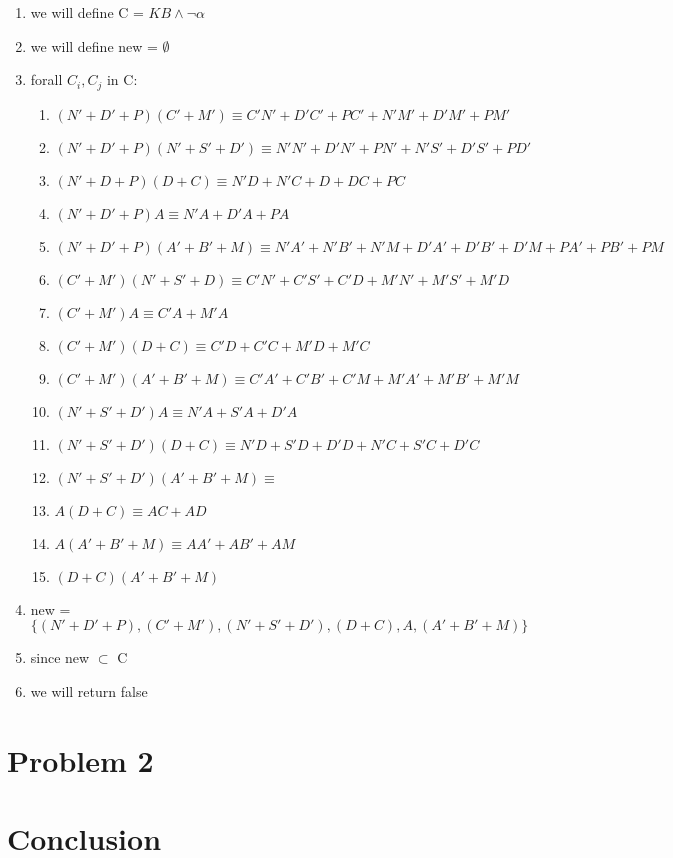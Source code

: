 \documentclass{article}
\begin{document}
\begin{enumerate}
    \item we will define C = $KB \land \neg \alpha$
    \item we will define new = $\emptyset$
    \item forall $C_i, C_j$ in C:
    \begin{enumerate}
        \item $(N'+D'+P)(C'+M') \equiv C'N'+D'C'+PC'+N'M'+D'M'+PM'$
        \item $(N'+D'+P)(N'+S'+D') \equiv N'N'+D'N'+PN'+N'S'+D'S'+PD'$
        \item $(N'+D+P)(D+C) \equiv N'D+N'C+D+DC+PC$
        \item $(N'+D'+P)A \equiv N'A+D'A+PA$
        \item $(N'+D'+P)(A'+B'+M) \equiv N'A'+N'B'+N'M+D'A'+D'B'+D'M+PA'+PB'+PM$
        \item $(C'+M')(N'+S'+D) \equiv C'N'+C'S'+C'D+M'N'+M'S'+M'D$
        \item $(C'+M')A \equiv C'A + M'A$
        \item $(C'+M')(D+C) \equiv C'D+C'C+M'D+M'C$
        \item $(C'+M')(A'+B'+M) \equiv C'A'+C'B'+C'M+M'A'+M'B'+M'M$
        \item $(N'+S'+D')A \equiv N'A+S'A+D'A $
        \item $(N'+S'+D')(D+C) \equiv N'D+S'D+D'D+N'C+S'C+D'C $
        \item $(N'+S'+D')(A'+B'+M) \equiv $
        \item $A(D+C) \equiv AC+AD$
        \item $A(A'+B'+M) \equiv AA'+AB'+AM$
        \item $(D+C)(A'+B'+M)$
    \end{enumerate}
    \item new = $\{(N'+D'+P),(C'+M'),(N'+S'+D'),(D+C),A,(A'+B'+M)\}$
    \item since new $\subset$ C
    \item we will return false
\end{enumerate}

\section{Problem 2}

\section{Conclusion}
\end{document}
